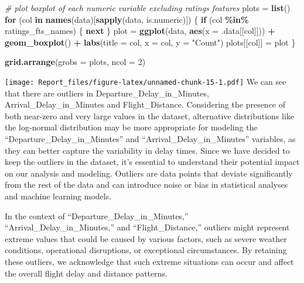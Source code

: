 \documentclass[
]{article}
\newenvironment{Shaded}{\begin{snugshade}}{\end{snugshade}}
\newcommand{\AttributeTok}[1]{\textcolor[rgb]{0.13,0.29,0.53}{#1}}
\newcommand{\CommentTok}[1]{\textcolor[rgb]{0.56,0.35,0.01}{\textit{#1}}}
\newcommand{\ControlFlowTok}[1]{\textcolor[rgb]{0.13,0.29,0.53}{\textbf{#1}}}
\newcommand{\DecValTok}[1]{\textcolor[rgb]{0.00,0.00,0.81}{#1}}
\newcommand{\FunctionTok}[1]{\textcolor[rgb]{0.13,0.29,0.53}{\textbf{#1}}}
\newcommand{\NormalTok}[1]{#1}
\newcommand{\OtherTok}[1]{\textcolor[rgb]{0.56,0.35,0.01}{#1}}
\newcommand{\SpecialCharTok}[1]{\textcolor[rgb]{0.81,0.36,0.00}{\textbf{#1}}}
\newcommand{\StringTok}[1]{\textcolor[rgb]{0.31,0.60,0.02}{#1}}
\begin{document}
\begin{Shaded}
\begin{Highlighting}[]
\CommentTok{\# plot boxplot of each numeric variable excluding ratings features}
\NormalTok{plots }\OtherTok{=} \FunctionTok{list}\NormalTok{()}
\ControlFlowTok{for}\NormalTok{ (col }\ControlFlowTok{in} \FunctionTok{names}\NormalTok{(data)[}\FunctionTok{sapply}\NormalTok{(data, is.numeric)]) \{}
  \ControlFlowTok{if}\NormalTok{ (col }\SpecialCharTok{\%in\%}\NormalTok{ ratings\_fts\_names) \{}
    \ControlFlowTok{next}
\NormalTok{  \}}
\NormalTok{  plot }\OtherTok{=} \FunctionTok{ggplot}\NormalTok{(data, }\FunctionTok{aes}\NormalTok{(}\AttributeTok{x =}\NormalTok{ .data[[col]])) }\SpecialCharTok{+}
  \FunctionTok{geom\_boxplot}\NormalTok{() }\SpecialCharTok{+}
  \FunctionTok{labs}\NormalTok{(}\AttributeTok{title =}\NormalTok{ col, }\AttributeTok{x =}\NormalTok{ col, }\AttributeTok{y =} \StringTok{"Count"}\NormalTok{) }
\NormalTok{  plots[[col]] }\OtherTok{=}\NormalTok{ plot}
\NormalTok{\}}

\FunctionTok{grid.arrange}\NormalTok{(}\AttributeTok{grobs =}\NormalTok{ plots, }\AttributeTok{ncol =} \DecValTok{2}\NormalTok{)}
\end{Highlighting}
\end{Shaded}

\texttt{[image: Report\_files/figure-latex/unnamed-chunk-15-1.pdf]} We
can see that there are outliers in Departure\_Delay\_in\_Minutes,
Arrival\_Delay\_in\_Minutes and Flight\_Distance. Considering the
presence of both near-zero and very large values in the dataset,
alternative distributions like the log-normal distribution may be more
appropriate for modeling the ``Departure\_Delay\_in\_Minutes'' and
``Arrival\_Delay\_in\_Minutes'' variables, as they can better capture
the variability in delay times. Since we have decided to keep the
outliers in the dataset, it's essential to understand their potential
impact on our analysis and modeling. Outliers are data points that
deviate significantly from the rest of the data and can introduce noise
or bias in statistical analyses and machine learning models.

In the context of ``Departure\_Delay\_in\_Minutes,''
``Arrival\_Delay\_in\_Minutes,'' and ``Flight\_Distance,'' outliers
might represent extreme values that could be caused by various factors,
such as severe weather conditions, operational disruptions, or
exceptional circumstances. By retaining these outliers, we acknowledge
that such extreme situations can occur and affect the overall flight
delay and distance patterns.
\end{document}
